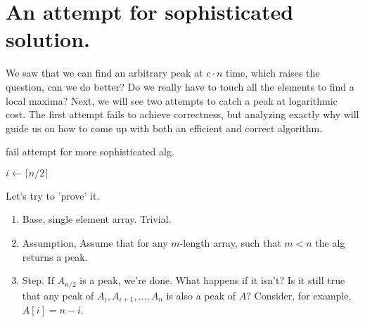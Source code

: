 \section{An attempt for sophisticated solution.}
We saw that we can find an arbitrary peak at $c\cdot n$ time, which raises the question, can we do better? Do we really have to touch all the elements to find a local maxima? Next, we will see two attempts to catch a peak at logarithmic cost. The first attempt fails to achieve correctness, but analyzing exactly why will guide us on how to come up with both an efficient and correct algorithm.
\begin{algorithm}
\caption{fail attempt for more sophisticated alg. }
        $ i \leftarrow  \lceil n/2 \rceil $\\
\end{algorithm}

Let's try to 'prove' it.  
\begin{enumerate}
 \item Base, single element array. Trivial. 
  \item Assumption, Assume that for any $m$-length array, such that $m<n$ the alg returns a peak. 
  \item Step. If $A_{n/2}$ is a peak, we're done. What happens if it isn't? Is it still true that any peak of $A_{i},A_{i+1}, \ldots, A_{n}$ is also a peak of $A$? Consider, for example, $A[i] = n - i$.
\end{enumerate}

